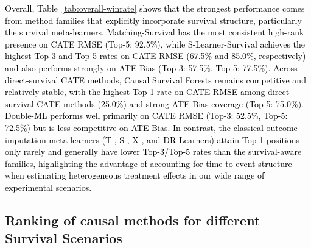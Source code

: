 \documentclass{article} %
\newcommand{\rebuttal}[1]{\textcolor{black}{#1}}
\begin{document}
\rebuttal{
Overall, Table~\ref{tab:overall-winrate} shows that the strongest performance comes from method families that explicitly incorporate survival structure, particularly the survival meta-learners. Matching-Survival has the most consistent high-rank presence on CATE RMSE (Top-5: 92.5\%), while S-Learner-Survival achieves the highest Top-3 and Top-5 rates on CATE RMSE (67.5\% and 85.0\%, respectively) and also performs strongly on ATE Bias (Top-3: 57.5\%, Top-5: 77.5\%). Across direct-survival CATE methods, Causal Survival Forests remains competitive and relatively stable, with the highest Top-1 rate on CATE RMSE among direct-survival CATE methods (25.0\%) and strong ATE Bias coverage (Top-5: 75.0\%). Double-ML performs well primarily on CATE RMSE (Top-3: 52.5\%, Top-5: 72.5\%) but is less competitive on ATE Bias. In contrast, the classical outcome-imputation meta-learners (T-, S-, X-, and DR-Learners) attain Top-1 positions only rarely and generally have lower Top-3/Top-5 rates than the survival-aware families, highlighting the advantage of accounting for time-to-event structure when estimating heterogeneous treatment effects in our wide range of experimental scenarios.
}





\clearpage

\subsection{Ranking of causal methods for different Survival Scenarios}
\label{app:average_rank_per_scenario}
\end{document}
